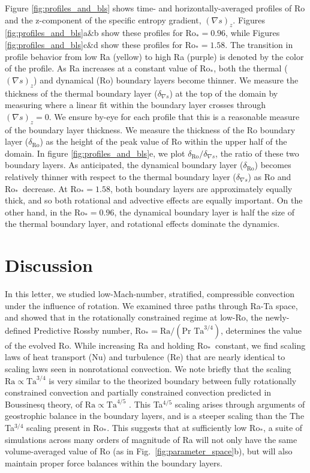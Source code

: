 \documentclass[twocolumn, amsmath, amsfonts, amssymb]{aastex62}
\newcommand{\grad}{\ensuremath{\nabla}}
\newcommand{\pro}{\ensuremath{\text{Ro}_{\text{*}}}}
\begin{document}
Figure \ref{fig:profiles_and_bls} shows time- and horizontally-averaged profiles of
Ro and the z-component of the specific entropy gradient, $(\grad s)_z$.
Figures \ref{fig:profiles_and_bls}a\&b show these profiles for $\pro=0.96$, while
Figures \ref{fig:profiles_and_bls}c\&d show these profiles for $\pro=1.58$. The transition
in profile behavior from low Ra (yellow) to high Ra (purple) is denoted by the color of the
profile.
As Ra increases at a constant value of
\pro, both the thermal ($(\grad s)_z$) and dynamical (Ro) boundary layers become thinner. 
We measure the
thickness of the thermal boundary layer ($\delta_{\grad s}$) at the top of the domain by 
measuring where a linear fit within the boundary layer crosses through $(\grad s)_z = 0$.
We ensure by-eye for each profile that this is a reasonable measure of the boundary
layer thickness. We measure
the thickness of the Ro boundary layer ($\delta_{\text{Ro}}$) 
as the height of the peak value of Ro within the
upper half of the domain.
In figure \ref{fig:profiles_and_bls}e, we plot $\delta_{\text{Ro}}/\delta_{\grad s}$, the ratio
of these two boundary layers. As anticipated, the dynamical boundary layer ($\delta_{\text{Ro}}$)
becomes relatively thinner with respect to the thermal boundary layer ($\delta_{\grad s}$)
as Ro and \pro$\,$ decrease. At $\pro = 1.58$, both boundary layers are approximately equally
thick, and so both rotational and advective effects are equally important. On the other hand,
in the $\pro = 0.96$, the dynamical boundary layer is half the size of the thermal boundary
layer, and rotational effects dominate the dynamics.

\newpage
\section{Discussion}
\label{sec:discussion}
In this letter, we studied low-Mach-number, stratified, compressible convection 
under the influence of rotation.
We examined three paths through Ra-Ta space, and showed that in the rotationally
constrained regime at low-Ro, the newly-defined 
Predictive Rossby number, $\pro = \text{Ra}/(\text{Pr }\text{Ta}^{3/4})$, determines the value of
the evolved Ro. While increasing Ra and holding \pro$\,$ constant,
we find scaling laws of heat transport (Nu) and turbulence (Re) that are nearly identical
to scaling laws seen in nonrotational convection.
We note briefly that the scaling $\text{Ra} \propto \text{Ta}^{3/4}$ is very similar to
the theorized boundary between fully rotationally constrained convection and 
partially constrained convection predicted in Boussinesq theory, of 
$\text{Ra} \propto \text{Ta}^{4/5}$ \citep{julien&all2012, gastine&all2016}. This
Ta$^{4/5}$ scaling arises through arguments of geostrophic balance in the boundary layers,
and is a steeper scaling than the The Ta$^{3/4}$ scaling present in \pro.
This suggests that at sufficiently low \pro, a suite of simulations across many orders
of magnitude of Ra will not only have the same volume-averaged value of Ro 
(as in Fig.~\ref{fig:parameter_space}b), but will
also maintain proper force balances within the boundary layers.
\end{document}
